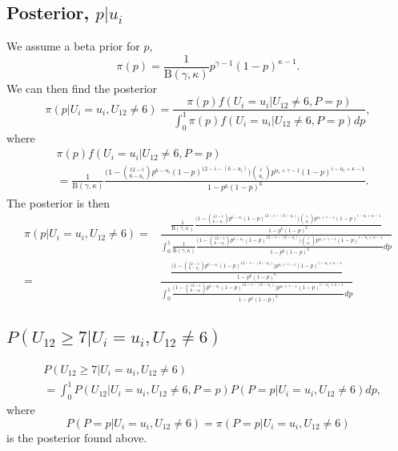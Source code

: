 \documentclass{article}
\begin{document}
\subsection{Posterior, $p|u_{i}$}
We assume a beta prior for $p$,
\begin{equation*}
    \pi(p)=\frac{1}{\text{B}(\gamma,\kappa)}p^{\gamma-1}(1-p)^{\kappa-1}.
\end{equation*}
We can then find the posterior 
\begin{equation*}
    \pi(p|U_i=u_i,U_{12}\neq6) = \frac{\pi(p)f(U_i=u_i|U_{12}\neq6,P=p)}{\int^1_0 \pi(p)f(U_i=u_i|U_{12}\neq6,P=p) dp},
\end{equation*}
where 
\begin{equation*}
    \begin{aligned}
        &\pi(p)f(U_i=u_i|U_{12}\neq6,P=p)\\[6pt]
        &= \frac{1}{\text{B}(\gamma,\kappa)}
        \frac{\Big(1 - \binom{12-i}{6-u_i}p^{6-u_i}(1-p)^{12-i-(6-u_i)}\Big)\binom{i}{u_i}p^{u_i+\gamma-1}(1-p)^{i-u_i+\kappa-1}}
        {1-p^6(1-p)^6}.
    \end{aligned}
\end{equation*}
The posterior is then
\begin{equation*}
    \begin{aligned}
        \pi(p|U_i=u_i,U_{12}\neq6) 
        =&       \frac{\frac{1}{\text{B}(\gamma,\kappa)}
        \frac{\Big(1 - \binom{12-i}{6-u_i}p^{6-u_i}(1-p)^{12-i-(6-u_i)}\Big)\binom{i}{u_i}p^{u_i+\gamma-1}(1-p)^{i-u_i+\kappa-1}}
        {1-p^6(1-p)^6}}{\int^1_0 \frac{1}{\text{B}(\gamma,\kappa)}
        \frac{\Big(1 - \binom{12-i}{6-u_i}p^{6-u_i}(1-p)^{12-i-(6-u_i)}\Big)\binom{i}{u_i}p^{u_i+\gamma-1}(1-p)^{i-u_i+\kappa-1}}
        {1-p^6(1-p)^6} dp}\\[10pt]
        =& \frac{
        \frac{\Big(1 - \binom{12-i}{6-u_i}p^{6-u_i}(1-p)^{12-i-(6-u_i)}\Big)p^{u_i+\gamma-1}(1-p)^{i-u_i+\kappa-1}}
        {1-p^6(1-p)^6}}{\int^1_0\frac{\Big(1 - \binom{12-i}{6-u_i}p^{6-u_i}(1-p)^{12-i-(6-u_i)}\Big)p^{u_i+\gamma-1}(1-p)^{i-u_i+\kappa-1}}
        {1-p^6(1-p)^6} dp}
    \end{aligned}
\end{equation*}

\subsection{$P(U_{12}\geq 7|U_i=u_i,U_{12}\neq6)$}
\begin{equation*}
    \begin{aligned}
        &P(U_{12}\geq 7|U_i=u_i,U_{12}\neq6)\\[6pt]
        &= \int^1_0 P(U_{12}|U_i=u_i,U_{12}\neq6,P=p)P(P=p|U_i=u_i,U_{12}\neq6) dp,
    \end{aligned}
\end{equation*}
where
\begin{equation*}
    P(P=p|U_i=u_i,U_{12}\neq6) = \pi(P=p|U_i=u_i,U_{12}\neq6)
\end{equation*}
is the posterior found above. 
\end{document}
